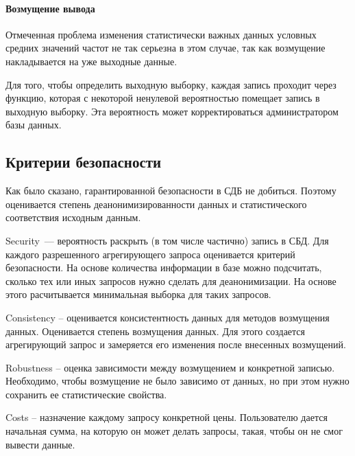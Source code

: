 \paragraph{Возмущение вывода}

Отмеченная проблема изменения статистически важных данных условных средних значений частот не так серьезна в этом случае, так как возмущение накладывается на уже выходные данные.

Для того, чтобы определить выходную выборку, каждая запись проходит через функцию, которая с некоторой ненулевой вероятностью помещает запись в выходную выборку. Эта вероятность может корректироваться администратором базы данных.

  \subsection{Критерии безопасности}

Как было сказано, гарантированной безопасности в СДБ не добиться. Поэтому оценивается степень деанонимизированности данных и статистического соответствия исходным данным.

Security~--- вероятность раскрыть (в том числе частично) запись в СБД. Для каждого разрешенного агрегирующего запроса оценивается критерий безопасности. На основе количества информации в базе можно подсчитать, сколько тех или иных запросов нужно сделать для деанонимизации. На основе этого расчитывается минимальная выборка для таких запросов.

Consistency -- оценивается консистентность данных для методов возмущения данных. Оценивается степень возмущения данных. Для этого создается агрегирующий запрос и замеряется его изменения после внесенных возмущений.

Robustness -- оценка зависимости между возмущением и конкретной записью. Необходимо, чтобы возмущение не было зависимо от данных, но при этом нужно сохранить ее статистические свойства.

Costs -- назначение каждому запросу конкретной цены. Пользователю дается начальная сумма, на которую он может делать запросы, такая, чтобы он не смог вывести данные.

